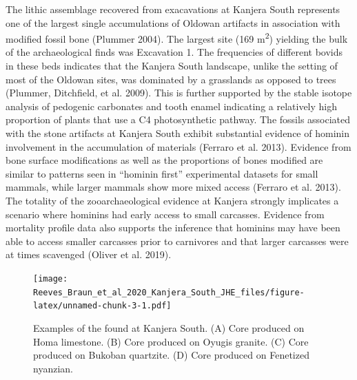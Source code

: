 \documentclass[]{elsarticle} %
\begin{document}
The lithic assemblage recovered from exacavations at Kanjera South
represents one of the largest single accumulations of Oldowan artifacts
in association with modified fossil bone (Plummer 2004). The largest
site (169 m\textsuperscript{2}) yielding the bulk of the archaeological
finds was Excavation 1. The frequencies of different bovids in these
beds indicates that the Kanjera South landscape, unlike the setting of
most of the Oldowan sites, was dominated by a grasslands as opposed to
trees (Plummer, Ditchfield, et al. 2009). This is further supported by
the stable isotope analysis of pedogenic carbonates and tooth enamel
indicating a relatively high proportion of plants that use a C4
photosynthetic pathway. The fossils associated with the stone artifacts
at Kanjera South exhibit substantial evidence of hominin involvement in
the accumulation of materials (Ferraro et al. 2013). Evidence from bone
surface modifications as well as the proportions of bones modified are
similar to patterns seen in ``hominin first'' experimental datasets for
small mammals, while larger mammals show more mixed access (Ferraro et
al. 2013). The totality of the zooarchaeological evidence at Kanjera
strongly implicates a scenario where hominins had early access to small
carcasses. Evidence from mortality profile data also supports the
inference that hominins may have been able to access smaller carcasses
prior to carnivores and that larger carcasses were at times scavenged
(Oliver et al. 2019).

\begin{figure}
\centering
\texttt{[image: Reeves\_Braun\_et\_al\_2020\_Kanjera\_South\_JHE\_files/figure-latex/unnamed-chunk-3-1.pdf]}
\caption{Examples of the found at Kanjera South. (A) Core produced on
Homa limestone. (B) Core produced on Oyugis granite. (C) Core produced
on Bukoban quartzite. (D) Core produced on Fenetized nyanzian.
\label{tools}}
\end{figure}
\end{document}
